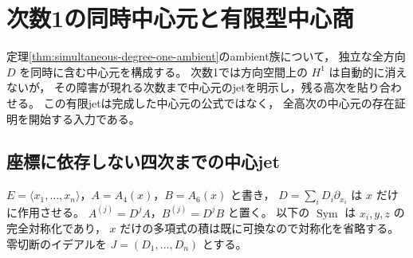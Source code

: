 \section{次数1の同時中心元と有限型中心商}
\label{sec:simultaneous-degree-one-center}

定理\ref{thm:simultaneous-degree-one-ambient}のambient族について，
独立な全方向 $D$ を同時に含む中心元を構成する。
次数1では方向空間上の $H^1$ は自動的に消えないが，
その障害が現れる次数まで中心元のjetを明示し，残る高次を貼り合わせる。
この有限jetは完成した中心元の公式ではなく，
全高次の中心元の存在証明を開始する入力である。

\subsection{座標に依存しない四次までの中心jet}

$E=\langle x_1,\ldots,x_n\rangle$，$A=A_4(x)$，$B=A_6(x)$ と書き，
$D=\sum_iD_i\partial_{x_i}$ は $x$ だけに作用させる。
$A^{(j)}=D^jA$，$B^{(j)}=D^jB$ と置く。
以下の $\operatorname{Sym}$ は $x_i,y,z$ の完全対称化であり，
$x$ だけの多項式の積は既に可換なので対称化を省略する。
零切断のイデアルを $J=(D_1,\ldots,D_n)$ とする。

